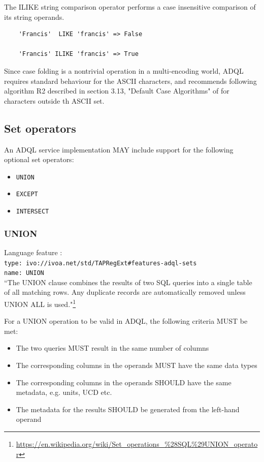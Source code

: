 \documentclass[11pt,a4paper]{ivoa}
\begin{document}
The ILIKE string comparison operator performs a case insensitive comparison
of its string operands.

\begin{verbatim}
    'Francis'  LIKE 'francis' => False

    'Francis' ILIKE 'francis' => True
\end{verbatim}

Since case folding is a nontrivial operation in a multi-encoding world,
ADQL requires standard behaviour for the ASCII characters, and recommends
following algorithm R2 described in section 3.13, "Default Case Algorithms"
of \citet{std:UNICODE} for characters outside th ASCII set.

\subsection{Set operators}
\label{sec:set.operators}

An ADQL service implementation MAY include support for the following optional
set operators:

\begin{itemize}
    \item \verb:UNION:
    \item \verb:EXCEPT:
    \item \verb:INTERSECT:
\end{itemize}

\subsubsection{UNION}
{\footnotesize Language feature :}\\
{\footnotesize \verb|type: ivo://ivoa.net/std/TAPRegExt#features-adql-sets|}\\
{\footnotesize \verb|name: UNION|}\\

``The UNION clause combines the results of two SQL queries into a single
table of all matching rows. Any duplicate records are automatically removed
unless UNION ALL is used."\footnote{\url{https://en.wikipedia.org/wiki/Set\_operations\_\%28SQL\%29UNION\_operator}}

For a UNION operation to be valid in ADQL, the following criteria MUST be met:

\begin{itemize}
    \item The two queries MUST result in the same number of columns
    \item The corresponding columns in the operands MUST have the same data types
    \item The corresponding columns in the operands SHOULD have the same metadata, e.g. units, UCD etc.
    \item The metadata for the results SHOULD be generated from the left-hand operand
\end{itemize}
\end{document}

